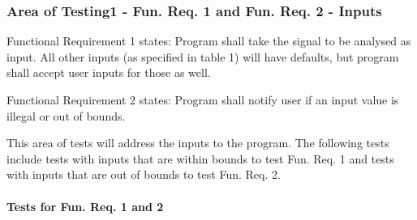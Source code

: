 \documentclass[12pt, titlepage]{article}
\begin{document}

		
\subsubsection{Area of Testing1 - Fun. Req. 1 and Fun. Req. 2 - Inputs}\label{test_input}

Functional Requirement 1 states: Program shall take the signal to be analysed as input. All other inputs (as specified in table 1) will have defaults, but program shall accept user inputs for those as well.

Functional Requirement 2 states: Program shall notify user if an input value is illegal or out of bounds.

This area of tests will address the inputs to the program. The following tests include  tests with inputs that are within bounds to test Fun. Req. 1 and tests with inputs that are out of bounds to test Fun. Req. 2.

\paragraph{Tests for Fun. Req. 1 and 2}
\end{document}
